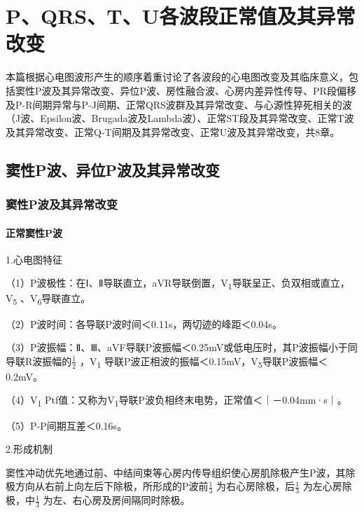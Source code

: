 \part{P、QRS、T、U各波段正常值及其异常改变}

本篇根据心电图波形产生的顺序着重讨论了各波段的心电图改变及其临床意义，包括窦性P波及其异常改变、异位P波、房性融合波、心房内差异性传导、PR段偏移及P-R间期异常与P-J间期、正常QRS波群及其异常改变、与心源性猝死相关的波（J波、Epsilon波、Brugada波及Lambda波）、正常ST段及其异常改变、正常T波及其异常改变、正常Q-T间期及其异常改变、正常U波及其异常改变，共8章。

\protect\hypertarget{text00007.html}{}{}

\protect\hypertarget{text00007.htmlux5cux23chapter7}{}{}

\chapter{窦性P波、异位P波及其异常改变}

\protect\hypertarget{text00007.htmlux5cux23subid1}{}{}

\section{窦性P波及其异常改变}

\protect\hypertarget{text00007.htmlux5cux23subid2}{}{}

\subsection{正常窦性P波}

1.心电图特征

（1）P波极性：在Ⅰ、Ⅱ导联直立，aVR导联倒置，V\textsubscript{1}导联呈正、负双相或直立，V\textsubscript{5} 、V\textsubscript{6}导联直立。

（2）P波时间：各导联P波时间＜0.11s，两切迹的峰距＜0.04s。

（3）P波振幅：Ⅱ、Ⅲ、aVF导联P波振幅＜0.25mV或低电压时，其P波振幅小于同导联R波振幅的$\frac{1}{2}$
，V\textsubscript{1} 导联P波正相波的振幅＜0.15mV，V\textsubscript{5}导联P波振幅＜0.2mV。

（4）V\textsubscript{1} Ptf值：又称为V\textsubscript{1}导联P波负相终末电势，正常值＜｜－0.04mm·s｜。

（5）P-P间期互差＜0.16s。

2.形成机制

窦性冲动优先地通过前、中结间束等心房内传导组织使心房肌除极产生P波，其除极方向从右前上向左后下除极，所形成的P波前$\frac{1}{3}$
为右心房除极，后$\frac{1}{3}$
为左心房除极，中$\frac{1}{3}$
为左、右心房及房间隔同时除极。

